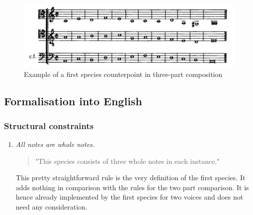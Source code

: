 \begin{figure}[h]
    \centering
    \includegraphics[width=1\textwidth]{Images/Species_examples/1sp-example.png}
    \caption{Example of a first species counterpoint in three-part composition}
    \label{fig:example-1sp}
\end{figure}

\subsection{Formalisation into English}
\subsubsection{Structural constraints}
\begin{enumerate}[wide, label=\bfseries 1.S\arabic*]
    \item\label{rule:allwhole} \textit{All notes are whole notes.}
     
    \begin{quotation}
       "This species consists of three whole notes in each instance."
       \textcite[p.71]{GaPEng}
   \end{quotation}

   This pretty straightforward rule is the very definition of the first species. It adds nothing in comparison with the rules for the two part comparison. It is hence already implemented by the first species for two voices and does not need any consideration. 
\end{enumerate}
